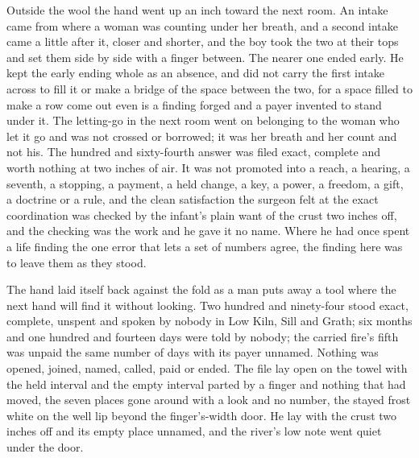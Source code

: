 Outside the wool the hand went up an inch toward the next room. An intake came from where a woman was counting under her breath, and a second intake came a little after it, closer and shorter, and the boy took the two at their tops and set them side by side with a finger between. The nearer one ended early. He kept the early ending whole as an absence, and did not carry the first intake across to fill it or make a bridge of the space between the two, for a space filled to make a row come out even is a finding forged and a payer invented to stand under it. The letting-go in the next room went on belonging to the woman who let it go and was not crossed or borrowed; it was her breath and her count and not his. The hundred and sixty-fourth answer was filed exact, complete and worth nothing at two inches of air. It was not promoted into a reach, a hearing, a seventh, a stopping, a payment, a held change, a key, a power, a freedom, a gift, a doctrine or a rule, and the clean satisfaction the surgeon felt at the exact coordination was checked by the infant's plain want of the crust two inches off, and the checking was the work and he gave it no name. Where he had once spent a life finding the one error that lets a set of numbers agree, the finding here was to leave them as they stood.

The hand laid itself back against the fold as a man puts away a tool where the next hand will find it without looking. Two hundred and ninety-four stood exact, complete, unspent and spoken by nobody in Low Kiln, Sill and Grath; six months and one hundred and fourteen days were told by nobody; the carried fire's fifth was unpaid the same number of days with its payer unnamed. Nothing was opened, joined, named, called, paid or ended. The file lay open on the towel with the held interval and the empty interval parted by a finger and nothing that had moved, the seven places gone around with a look and no number, the stayed frost white on the well lip beyond the finger's-width door. He lay with the crust two inches off and its empty place unnamed, and the river's low note went quiet under the door.
